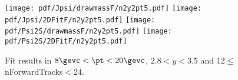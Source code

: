 \begin{figure}[H]
\begin{center}
\texttt{[image: pdf/Jpsi/drawmassF/n2y2pt5.pdf]}
\texttt{[image: pdf/Jpsi/2DFitF/n2y2pt5.pdf]}
\vspace*{-0.5cm}
\texttt{[image: pdf/Psi2S/drawmassF/n2y2pt5.pdf]}
\texttt{[image: pdf/Psi2S/2DFitF/n2y2pt5.pdf]}
\vspace*{-0.5cm}
\end{center}
\caption{Fit results in $8\gevc<\pt<20\gevc$, $2.8<y<3.5$ and 12$\leq$nForwardTracks$<$24.}
\label{Fitn2y2pt5}
\end{figure}
